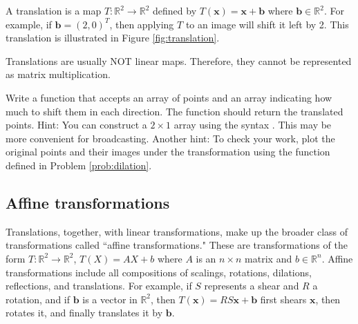 A translation is a map $T: \mathbb{R}^2 \rightarrow \mathbb{R}^2$ defined by $T(\mathbf{x}) = \mathbf{x}+\mathbf{b}$ where $\mathbf{b} \in \mathbb{R}^2$. 
For example, if $\mathbf{b} = (2, 0)^T$, then applying $T$ to an image will shift it left by 2. 
This translation is illustrated in Figure \ref{fig:translation}.


Translations are usually NOT linear maps. 
Therefore, they cannot be represented as matrix multiplication.

\begin{problem}
Write a function that accepts an array of points and an array indicating how much to shift them in each direction. 
The function should return the translated points. 
Hint: You can construct a $2 \times 1$ array using the syntax . 
This may be more convenient for broadcasting. 
Another hint: To check your work, plot the original points and their images under the transformation using the function  defined in Problem \ref{prob:dilation}.
\end{problem}

\subsection*{Affine transformations}
Translations, together, with linear transformations, make up the broader class of transformations called ``affine transformations." 
These are transformations of the form $T: \mathbb{R}^2 \to \mathbb{R}^2$, $T(X) = AX + b$ where $A$ is an $n\times n$ matrix and $b \in \mathbb{R}^n$. 
Affine transformations include all compositions of scalings, rotations, dilations, reflections, and translations. 
For example, if $S$ represents a shear and $R$ a rotation, and if $\mathbf{b}$ is a vector in $\mathbb{R}^2$, then $T(\mathbf{x}) = RS\mathbf{x} + \mathbf{b}$ first shears $\mathbf{x}$, then rotates it, and finally translates it by $\mathbf{b}$. 


